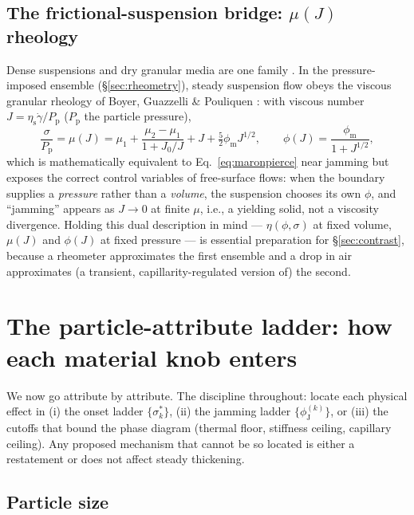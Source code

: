 \documentclass[11pt]{article}
\newcommand{\phiJ}{\phi_{\mathrm{J}}}
\newcommand{\phiM}{\phi_{\mathrm{m}}}
\newcommand{\sigmastar}{\sigma^{*}}
\newcommand{\etas}{\eta_{\mathrm{s}}}
\newcommand{\gdot}{\dot{\gamma}}
\begin{document}
\subsection{The frictional-suspension bridge: $\mu(J)$ rheology}
\label{sec:muJ}
Dense suspensions and dry granular media are one family \cite{gdrmidi2004}. In the pressure-imposed ensemble (\S\ref{sec:rheometry}), steady suspension flow obeys the viscous granular rheology of Boyer, Guazzelli \& Pouliquen \cite{boyer2011}: with viscous number $J = \etas\gdot/P_{\mathrm{p}}$ ($P_{\mathrm{p}}$ the particle pressure),
\begin{equation}
\frac{\sigma}{P_{\mathrm{p}}} = \mu(J) = \mu_1 + \frac{\mu_2-\mu_1}{1 + J_0/J} + J + \tfrac{5}{2}\phiM J^{1/2},
\qquad
\phi(J) = \frac{\phiM}{1 + J^{1/2}},
\label{eq:muJ}
\end{equation}
which is mathematically equivalent to Eq.~\eqref{eq:maronpierce} near jamming but exposes the correct control variables of free-surface flows: when the boundary supplies a \emph{pressure} rather than a \emph{volume}, the suspension chooses its own $\phi$, and ``jamming'' appears as $J \to 0$ at finite $\mu$, i.e., a yielding solid, not a viscosity divergence. Holding this dual description in mind --- $\eta(\phi,\sigma)$ at fixed volume, $\mu(J)$ and $\phi(J)$ at fixed pressure --- is essential preparation for \S\ref{sec:contrast}, because a rheometer approximates the first ensemble and a drop in air approximates (a transient, capillarity-regulated version of) the second.

\section{The particle-attribute ladder: how each material knob enters}
\label{sec:attributes}

We now go attribute by attribute. The discipline throughout: locate each physical effect in (i) the onset ladder $\{\sigmastar_k\}$, (ii) the jamming ladder $\{\phiJ^{(k)}\}$, or (iii) the cutoffs that bound the phase diagram (thermal floor, stiffness ceiling, capillary ceiling). Any proposed mechanism that cannot be so located is either a restatement or does not affect steady thickening.

\subsection{Particle size}
\label{sec:size}
\end{document}

